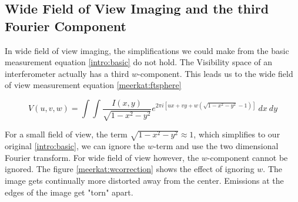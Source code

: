 \subsection{Wide Field of View Imaging and the third Fourier Component} \label{meerkat:wof}
In wide field of view imaging, the simplifications we could make from the basic measurement equation \eqref{intro:basic} do not hold. The Visibility space of an interferometer actually has a third $w$-component. This leads us to the wide field of view measurement equation \eqref{meerkat:ftsphere}

\begin{equation}\label{meerkat:ftsphere}
V(u, v, w) = \int\int \frac{I(x, y)}{\sqrt{1 - x^2 - y ^2}} e^{2 \pi i [ux+vy+ w(\sqrt{1 - x^2 - y ^2} - 1)]} \: dx \: dy
\end{equation}

For a small field of view, the term  $\sqrt{1 - x^2 - y ^2} \approx 1$, which simplifies to our original \eqref{intro:basic}, we can ignore the $w$-term and use the two dimensional Fourier transform. For wide field of view however, the $w$-component cannot be ignored. The figure \ref{meerkat:wcorrection} shows the effect of ignoring $w$. The image gets continually more distorted away from the center. Emissions at the edges of the image get "torn" apart.


